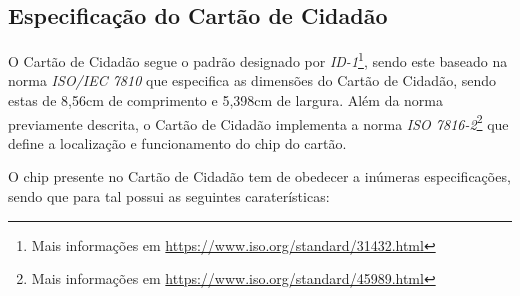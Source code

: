 
\subsection{Especificação do Cartão de Cidadão} \label{espCC}

O Cartão de Cidadão segue o padrão designado por \emph{ID-1}\footnote{Mais informações em \url{https://www.iso.org/standard/31432.html}}, sendo este baseado na norma \emph{ISO/IEC 7810} que especifica as dimensões do Cartão de Cidadão, sendo estas de 8,56cm de comprimento e 5,398cm de largura. Além da norma previamente descrita, o Cartão de Cidadão implementa a norma \emph{ISO 7816-2}\footnote{Mais informações em \url{https://www.iso.org/standard/45989.html}} que define a localização e funcionamento do chip do cartão.

O chip presente no Cartão de Cidadão tem de obedecer a inúmeras especificações, sendo que para tal possui as seguintes caraterísticas:

